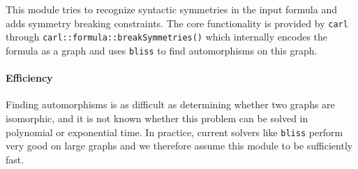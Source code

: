 This module tries to recognize syntactic symmetries in the input formula and adds symmetry breaking constraints.
The core functionality is provided by \texttt{carl} through \texttt{carl::formula::breakSymmetries()} which internally encodes the formula as a graph and uses \texttt{bliss} to find automorphisms on this graph.

\paragraph{Efficiency}
Finding automorphisms is as difficult as determining whether two graphs are isomorphic, and it is not known whether this problem can be solved in polynomial or exponential time.
In practice, current solvers like \texttt{bliss} perform very good on large graphs and we therefore assume this module to be sufficiently fast.
